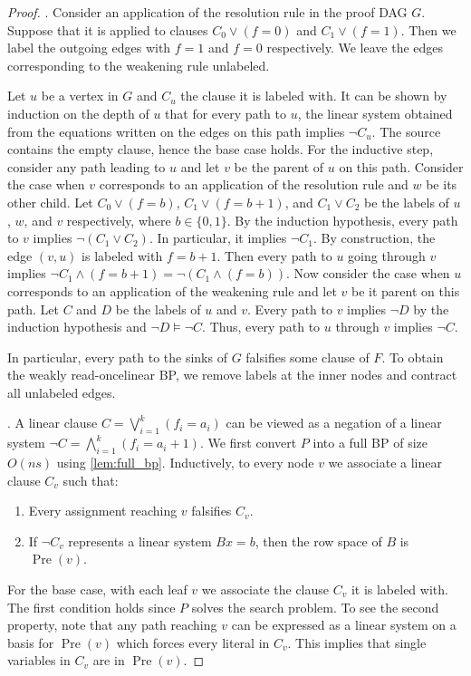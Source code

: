 \documentclass[a4paper,11pt,draft]{article}
\theoremstyle{definition}
\theoremstyle{remark}
\DeclareMathOperator{\pre}{Pre}
\newcommand{\wreadonce}{weakly read-once}
\begin{document}
\begin{proof}
   .
  Consider an application of the resolution rule in the proof DAG $G$. Suppose that it is applied to clauses $C_0 \lor (f = 0)$ and $C_1 \lor (f = 1)$. Then we label the outgoing edges with $f=1$ and $f=0$ respectively.
  We leave the edges corresponding to the weakening rule unlabeled.

  Let $u$ be a vertex in $G$ and $C_u$ the clause it is labeled with. It can be shown by induction on the depth of $u$ that for every path to $u$, the linear system obtained from the equations written on the edges on this path implies $\neg C_u$. The source contains the empty clause, hence the base case holds. For the inductive step, consider any path leading to $u$ and let $v$ be the parent of $u$ on this path. Consider the case when $v$ corresponds to an application of the resolution rule and $w$ be its other child. Let $C_0 \lor (f=b)$, $C_1 \lor (f=b+1)$, and $C_1 \lor C_2$ be the labels of $u$, $w$, and $v$ respectively, where $b \in \{0,1\}$. By the induction hypothesis, every path to $v$ implies $\neg (C_1 \lor C_2)$. In particular, it implies $\neg C_1$. By construction, the edge $(v, u)$ is labeled with $f=b+1$. Then every path to $u$ going through $v$ implies $\neg C_1 \land (f=b+1) = \neg (C_1 \land (f = b))$. Now consider the case when $u$ corresponds to an application of the weakening rule and let $v$ be it parent on this path. Let $C$ and $D$ be the labels of $u$ and $v$. Every path to $v$ implies $\neg D$ by the induction hypothesis and $\neg D \vDash \neg C$. Thus, every path to $u$ through $v$ implies $\neg C$.

  In particular, every path to the sinks of $G$ falsifies some clause of $F$. To obtain the \wreadonce linear BP, we remove labels at the inner nodes and contract all unlabeled edges.

  \medskip
  .
%
  A linear clause $C = \bigvee_{i=1}^k (f_i = a_i)$ can be viewed as a negation of a linear system $\neg C = \bigwedge_{i=1}^k (f_i = a_i + 1)$.
  We first convert $P$ into a full BP of size $O(ns)$ using \cref{lem:full_bp}. Inductively, to every node $v$ we associate a linear clause $C_v$ such that:
  \begin{enumerate}
    \item Every assignment reaching $v$ falsifies $C_v$.
    \item If $\neg C_v$ represents a linear system $Bx = b$, then the row space of $B$ is $\pre(v)$.
  \end{enumerate}
  For the base case, with each leaf $v$ we associate the clause $C_v$ it is labeled with. The first condition holds since $P$ solves the search problem. To see the second property, note that any path reaching $v$ can be expressed as a linear system on a basis for $\pre(v)$ which forces every literal in $C_v$. This implies that single variables in $C_v$ are in $\pre(v)$.


\end{proof}
\end{document}
